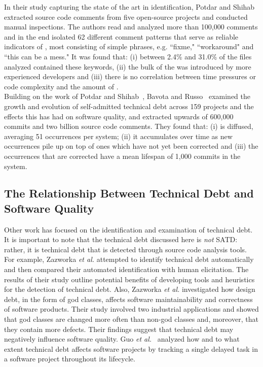 In their study capturing the state of the art in \SATD identification, Potdar and Shihab~\cite{ICSM_PotdarS14} extracted source code comments from five open-source projects and conducted manual inspections. The authors read and analyzed more than 100,000 comments and in the end isolated 62 different comment patterns that serve as reliable indicators of \SATD, most consisting of simple phrases, e.g. ``fixme," ``workaround" and ``this can be a mess." It was found that: (i) between 2.4\% and 31.0\% of the files analyzed contained these keywords, (ii) the bulk of the \SATD was introduced by more experienced developers and (iii) there is no correlation between time pressures or code complexity and the amount of \SATD.\\

Building on the work of Potdar and Shihab~\cite{ICSM_PotdarS14}, Bavota and Russo~\cite{bavota2016large} examined the growth and evolution of self-admitted technical debt across 159 projects and the effects this has had on software quality, and extracted upwards of 600,000 commits and two billion source code comments. They found that: (i) \SATD is diffused, averaging 51 occurrences per system; (ii) it accumulates over time as new occurrences pile up on top of ones which have not yet been corrected and (iii) the occurrences that are corrected have a mean lifespan of 1,000 commits in the system.\\




\subsection{The Relationship Between Technical Debt and Software Quality}

Other work has focused on the identification and examination of technical debt. It is important to note that the technical debt discussed here is \emph{not} SATD: rather, it is technical debt that is detected through source code analysis tools. For example,  Zazworka {\em et al.} \cite{Zazworka:2013} attempted to identify technical debt automatically and then compared their automated identification with human elicitation. The results of their study outline potential benefits of developing tools and heuristics for the detection of technical debt. Also, Zazworka {\em et al.} \cite{zazworka2011investigating} investigated how design debt, in the form of god classes, affects software maintainability and correctness of software products. Their study involved two industrial applications and showed that god classes are changed more often than non-god classes and, moreover, that they contain more defects. Their findings suggest that technical debt may negatively influence software quality. Guo {\em et al.}~\cite{GuoSGCTSSS11} analyzed how and to what extent technical debt affects software projects by tracking a single delayed task in a software project throughout its lifecycle.

